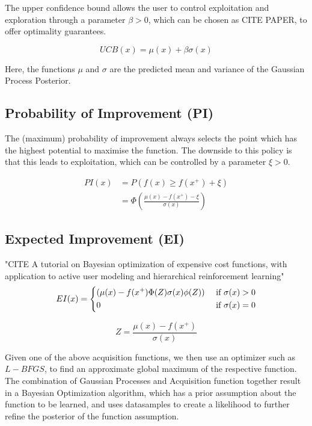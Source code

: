 \documentclass[a4paper,12pt,twoside,openright]{report}
\begin{document}
The upper confidence bound allows the user to control exploitation and exploration through a parameter $\beta > 0$, which can be chosen as CITE PAPER, to offer optimality guarantees.

\begin{equation}
UCB(x) = \mu(x) + \beta \sigma(x)
\end{equation}

Here, the functions $\mu$ and $\sigma$ are the predicted mean and variance of the Gaussian Process Posterior.

\subsection{Probability of Improvement (PI)}
The (maximum) probability of improvement always selects the point which has the highest potential to maximise the function. 
The downside to this policy is that this leads to exploitation, which can be controlled by a parameter $\xi > 0$.

\begin{align}
    PI(x) & = P( f(x) \geq f(x^+) + \xi ) \\
    & = \Phi ( \frac{\mu(x) - f(x^+) - \xi}{\sigma(x)}  ) 
\end{align}


\subsection{Expected Improvement (EI)}

"CITE A tutorial on Bayesian optimization of expensive cost functions, with application to active user modeling and hierarchical reinforcement learning"
\begin{align}
    EI(x) =
    \begin{dcases}
        ( \mu (x) - f(x^+) \Phi(Z) \sigma (x) \phi (Z) )  & \text{ if } \sigma (x) > 0 \\
        0 & \text{ if } \sigma (x) = 0
    \end{dcases} \\
\end{align}

\begin{equation}
    Z = \frac{\mu (x) - f(x^+) }{\sigma(x)}
\end{equation}

Given one of the above acquisition functions, we then use an optimizer such as $L-BFGS$, to find an approximate global maximum of the respective function.
The combination of Gaussian Processes and Acquisition function together result in a Bayesian Optimization algorithm, which has a prior assumption about the function to be learned, and uses datasamples to create a likelihood to further refine the posterior of the function assumption.
\end{document}

